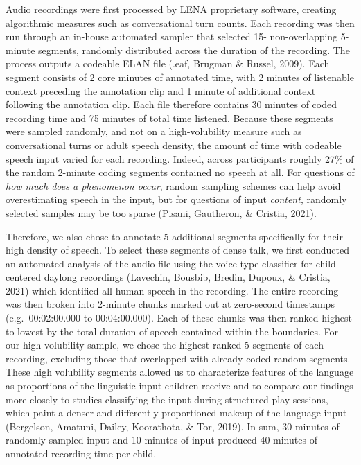 \documentclass[
  man,floatsintext]{apa6}
\begin{document}
Audio recordings were first processed by LENA proprietary software, creating algorithmic measures such as conversational turn counts. Each recording was then run through an in-house automated sampler that selected 15- non-overlapping 5-minute segments, randomly distributed across the duration of the recording. The process outputs a codeable ELAN file (.eaf, Brugman \& Russel, 2009). Each segment consists of 2 core minutes of annotated time, with 2 minutes of listenable context preceding the annotation clip and 1 minute of additional context following the annotation clip. Each file therefore contains 30 minutes of coded recording time and 75 minutes of total time listened. Because these segments were sampled randomly, and not on a high-volubility measure such as conversational turns or adult speech density, the amount of time with codeable speech input varied for each recording. Indeed, across participants roughly 27\% of the random 2-minute coding segments contained no speech at all. For questions of \emph{how much does a phenomenon occur}, random sampling schemes can help avoid overestimating speech in the input, but for questions of input \emph{content}, randomly selected samples may be too sparse (Pisani, Gautheron, \& Cristia, 2021).

Therefore, we also chose to annotate 5 additional segments specifically for their high density of speech. To select these segments of dense talk, we first conducted an automated analysis of the audio file using the voice type classifier for child-centered daylong recordings (Lavechin, Bousbib, Bredin, Dupoux, \& Cristia, 2021) which identified all human speech in the recording. The entire recording was then broken into 2-minute chunks marked out at zero-second timestamps (e.g.~00:02:00.000 to 00:04:00.000). Each of these chunks was then ranked highest to lowest by the total duration of speech contained within the boundaries. For our high volubility sample, we chose the highest-ranked 5 segments of each recording, excluding those that overlapped with already-coded random segments. These high volubility segments allowed us to characterize features of the language as proportions of the linguistic input children receive and to compare our findings more closely to studies classifying the input during structured play sessions, which paint a denser and differently-proportioned makeup of the language input (Bergelson, Amatuni, Dailey, Koorathota, \& Tor, 2019). In sum, 30 minutes of randomly sampled input and 10 minutes of input produced 40 minutes of annotated recording time per child.
\end{document}
